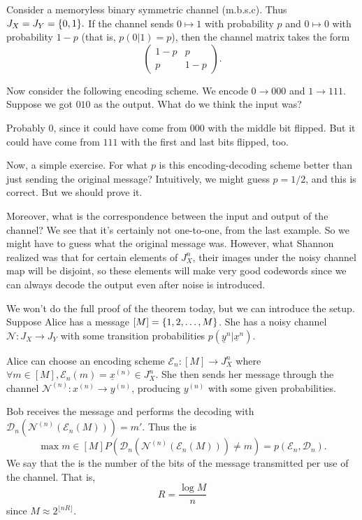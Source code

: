 \begin{exm}
    Consider a memoryless binary symmetric channel (m.b.s.c). Thus $J_X=J_Y=\{0,1\}.$ If the channel sends $0\mapsto 1$ with probability $p$ and $0\mapsto 0$ with probability $1-p$ (that is, $p(0|1)=p$), then the channel matrix takes the form
    \begin{equation}
        \begin{pmatrix}
            1-p & p\\
            p & 1-p
        \end{pmatrix}.
    \end{equation}
    
    Now consider the following encoding scheme. We encode $0\to 000$ and $1\to 111$. Suppose we got $010$ as the output. What do we think the input was?
    
    Probably $0$, since it could have come from $000$ with the middle bit flipped. But it could have come from $111$ with the first and last bits flipped, too.
    
    Now, a simple exercise. For what $p$ is this encoding-decoding scheme better than just sending the original message? Intuitively, we might guess $p=1/2$, and this is correct. But we should prove it.
\end{exm}

Moreover, what is the correspondence between the input and output of the channel? We see that it's certainly not one-to-one, from the last example. So we might have to guess what the original message was. However, what Shannon realized was that for certain elements of $J_X^n$, their images under the noisy channel map will be disjoint, so these elements will make very good codewords since we can always decode the output even after noise is introduced.

We won't do the full proof of the theorem today, but we can introduce the setup. Suppose Alice has a message $[M]=\{1,2,\ldots, M\}$. She has a noisy channel $\mathcal{N}:J_X \to J_Y$ with some transition probabilities $p(\underline y^{n}| \underline x^{n})$.

Alice can choose an encoding scheme $\mathcal{E}_n:[M]\to J_X^n$ where $\forall m\in [M], \mathcal{E}_n(m)=\underline x^{(n)} \in J_X^n$. She then sends her message through the channel $\mathcal{N}^{(n)}:x^{(n)}\to y^{(n)}$, producing $y^{(n)}$ with some given probabilities.

Bob receives the message and performs the decoding with $\mathcal{D}_n(\mathcal{N}^{(n)}(\mathcal{E}_n(M)))=m'$. Thus the  is
\begin{equation}
    \max{m\in [M]} P(\mathcal{D}_n(\mathcal{N}^{(n)}(\mathcal{E}_n(M))) \neq m) = p(\mathcal{E}_n,\mathcal{D}_n).
\end{equation}
We say that the  is the number of the bits of the message transmitted per use of the channel. That is,
\begin{equation}
    R= \frac{\log M}{n}
\end{equation}
since $M \approx 2^{\lfloor nR \rfloor}.$

